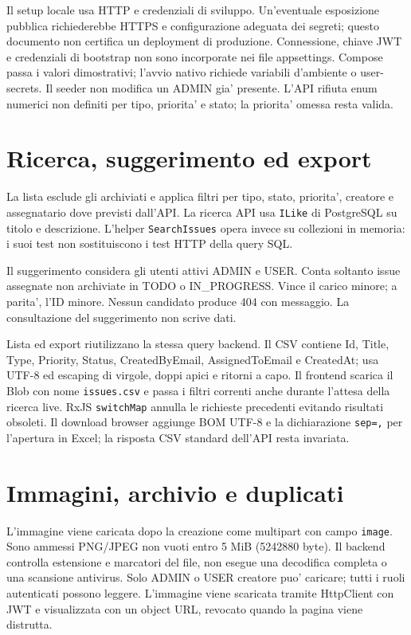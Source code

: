 \documentclass[11pt,a4paper,oneside]{report}
\begin{document}
Il setup locale usa HTTP e credenziali di sviluppo. Un'eventuale esposizione
pubblica richiederebbe HTTPS e configurazione adeguata dei segreti;
questo documento non certifica un deployment di produzione.
Connessione, chiave JWT e credenziali di bootstrap non sono incorporate nei
file appsettings. Compose passa i valori dimostrativi; l'avvio nativo richiede
variabili d'ambiente o user-secrets. Il seeder non modifica un ADMIN gia'
presente. L'API rifiuta enum numerici non definiti per tipo, priorita' e stato;
la priorita' omessa resta valida.

\section{Ricerca, suggerimento ed export}
La lista esclude gli archiviati e applica filtri per tipo, stato, priorita',
creatore e assegnatario dove previsti dall'API. La ricerca API usa
\texttt{ILike} di PostgreSQL su titolo e descrizione. L'helper
\texttt{SearchIssues} opera invece su collezioni in memoria: i suoi test
non sostituiscono i test HTTP della query SQL.

Il suggerimento considera gli utenti attivi ADMIN e USER. Conta soltanto
issue assegnate non archiviate in TODO o IN\_PROGRESS. Vince il carico
minore; a parita', l'ID minore. Nessun candidato produce 404 con messaggio.
La consultazione del suggerimento non scrive dati.

Lista ed export riutilizzano la stessa query backend. Il CSV contiene
Id, Title, Type, Priority, Status, CreatedByEmail, AssignedToEmail e
CreatedAt; usa UTF-8 ed escaping di virgole, doppi apici e ritorni a capo.
Il frontend scarica il Blob con nome \texttt{issues.csv} e passa i filtri
correnti anche durante l'attesa della ricerca live. RxJS \texttt{switchMap}
annulla le richieste precedenti evitando risultati obsoleti.
Il download browser aggiunge BOM UTF-8 e la dichiarazione \texttt{sep=,}
per l'apertura in Excel; la risposta CSV standard dell'API resta invariata.

\section{Immagini, archivio e duplicati}
L'immagine viene caricata dopo la creazione come multipart con campo
\texttt{image}. Sono ammessi PNG/JPEG non vuoti entro 5 MiB (5242880 byte).
Il backend controlla estensione e marcatori del file, non esegue una
decodifica completa o una scansione antivirus. Solo ADMIN o USER creatore
puo' caricare; tutti i ruoli autenticati possono leggere. L'immagine
viene scaricata tramite HttpClient con JWT e visualizzata con un object URL,
revocato quando la pagina viene distrutta.
\end{document}
